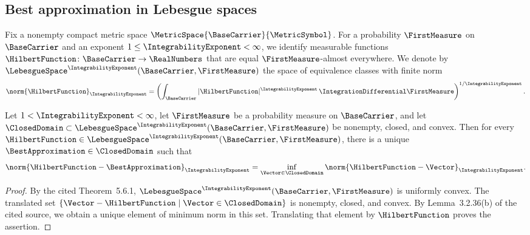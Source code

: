 \subsection{Best approximation in Lebesgue spaces}\label{subsec:spectral-preliminaries-lp}
Fix a nonempty compact metric space
$\MetricSpace{\BaseCarrier}{\MetricSymbol}$.
For a probability
$\FirstMeasure $
on
$\BaseCarrier $
and an exponent
$1\leq\IntegrabilityExponent<\infty$,
we identify measurable functions
$\HilbertFunction\colon\BaseCarrier\to\RealNumbers$
that are equal
$\FirstMeasure$-almost everywhere.
We denote by
$\LebesgueSpace^\IntegrabilityExponent (\BaseCarrier ,\FirstMeasure )$
the space of equivalence classes with finite norm
\[
 \norm{\HilbertFunction }_\IntegrabilityExponent =\left(\int_\BaseCarrier |\HilbertFunction |^\IntegrabilityExponent \,\IntegrationDifferential \FirstMeasure \right)^{1/\IntegrabilityExponent }.
\]

\begin{theorem}\label{thm:best-approximation}
Let
$1<\IntegrabilityExponent<\infty$,
let
$\FirstMeasure$
be a probability measure on
$\BaseCarrier$,
and let
$\ClosedDomain\subset\LebesgueSpace^{\IntegrabilityExponent}(\BaseCarrier,\FirstMeasure)$
be nonempty,
closed,
and convex.
Then for every
$\HilbertFunction\in\LebesgueSpace^{\IntegrabilityExponent}(\BaseCarrier,\FirstMeasure)$,
there is a unique
$\BestApproximation\in\ClosedDomain$
such that
\[
 \norm{\HilbertFunction-\BestApproximation}_{\IntegrabilityExponent}
 =\inf_{\Vector\in\ClosedDomain}\norm{\HilbertFunction-\Vector}_{\IntegrabilityExponent}.
\]
\end{theorem}

\begin{proof}
By the cited Theorem~5.6.1,
$\LebesgueSpace^{\IntegrabilityExponent}(\BaseCarrier,\FirstMeasure)$
is uniformly convex.
The translated set
$\{\Vector-\HilbertFunction\mid\Vector\in\ClosedDomain\}$
is nonempty,
closed,
and convex.
By Lemma~3.2.36(b) of the cited source,
we obtain a unique element of minimum norm in this set.
Translating that element by
$\HilbertFunction$
proves the assertion.
\end{proof}

